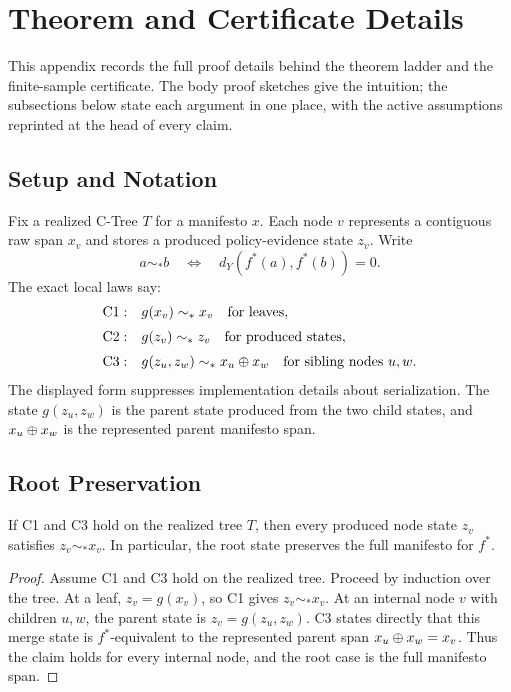 \section{Theorem and Certificate Details}
\label{app:v8-theorem-certificate-details}
\label{app:v8-full-proofs}

This appendix records the full proof details behind the theorem ladder
and the finite-sample certificate. The body proof sketches give the
intuition; the subsections below state each argument in one place,
with the active assumptions reprinted at the head of every claim.

\subsection{Setup and Notation}

Fix a realized C-Tree \(T\) for a manifesto \(x\). Each node \(v\) represents
a contiguous raw span \(x_v\) and stores a produced policy-evidence state
\(z_v\). Write
\[
  a\sim_\ast b
  \quad\Longleftrightarrow\quad
  d_Y\!\left(f^\ast(a),f^\ast(b)\right)=0 .
\]
The exact local laws say:
\[
\begin{array}{ll}
\mathrm{C1:} & g(x_v)\sim_\ast x_v \quad\text{for leaves},\\[2mm]
\mathrm{C2:} & g(z_v)\sim_\ast z_v \quad\text{for produced states},\\[2mm]
\mathrm{C3:} & g(z_u,z_w)\sim_\ast x_u\oplus x_w
  \quad\text{for sibling nodes }u,w .
\end{array}
\]
The displayed form suppresses implementation details about serialization. The
state \(g(z_u,z_w)\) is the parent state produced from the two child states,
and \(x_u\oplus x_w\) is the represented parent manifesto span.

\subsection{Root Preservation}

\begin{proposition}
\label{prop:v8-all-node-preservation}
If C1 and C3 hold on the realized tree \(T\), then every produced node state
\(z_v\) satisfies \(z_v\sim_\ast x_v\). In particular, the root state
preserves the full manifesto for \(f^\ast\).
\end{proposition}

\begin{proof}
Assume C1 and C3 hold on the realized tree. Proceed by induction over
the tree. At a leaf, \(z_v=g(x_v)\), so C1 gives \(z_v\sim_\ast x_v\).
At an internal node \(v\) with children \(u,w\), the parent state is
\(z_v=g(z_u,z_w)\). C3 states directly that this merge state is
\(f^\ast\)-equivalent to the represented parent span
\(x_u\oplus x_w=x_v\). Thus the claim holds for every internal node,
and the root case is the full manifesto span.
\end{proof}

